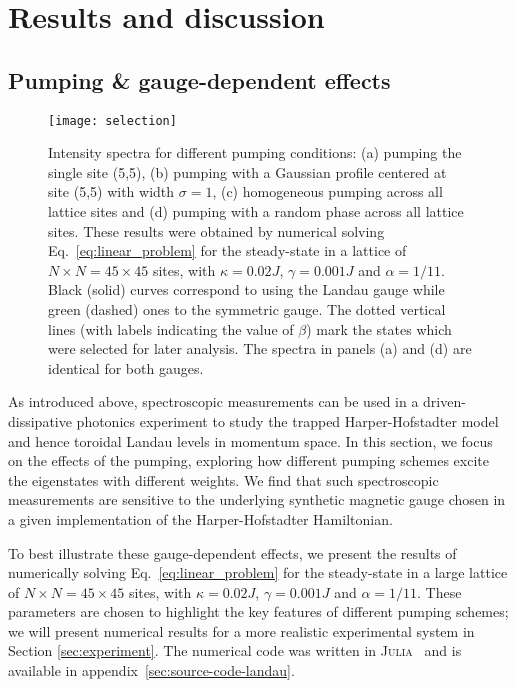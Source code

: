 \section{Results and discussion}
\label{sec:results}

\subsection{Pumping \& gauge-dependent effects}
\label{sec:selection}

\begin{figure}[tb]\centering
  \texttt{[image: selection]}
  \caption{Intensity spectra for different pumping conditions: (a)
pumping the single site (5,5), (b) pumping with a Gaussian profile
centered at site (5,5) with width $\sigma=1$, (c) homogeneous pumping
across all lattice sites and (d) pumping with a random phase across
all lattice sites. These results were obtained by numerical solving
Eq.~\eqref{eq:linear_problem} for the steady-state in a lattice of $N
\times N = 45 \times 45$ sites, with $\kappa = 0.02 J$, $\gamma =
0.001 J$ and $\alpha = 1/11$.  Black (solid) curves correspond to
using the Landau gauge while green (dashed) ones to the symmetric
gauge. The dotted vertical lines (with labels indicating the value of
$\beta$) mark the states which were selected for later analysis. The
spectra in panels (a) and (d) are identical for both gauges.}
  \label{fig:pumping_schemes}
\end{figure}

As introduced above, spectroscopic measurements can be used in a
driven-dissipative photonics experiment to study the trapped
Harper-Hofstadter model and hence toroidal Landau levels in momentum
space. In this section, we focus on the effects of the pumping,
exploring how different pumping schemes excite the eigenstates with
different weights. We find that such spectroscopic measurements are
sensitive to the underlying synthetic magnetic gauge chosen in a given
implementation of the Harper-Hofstadter Hamiltonian.

To best illustrate these gauge-dependent effects, we present the
results of numerically solving Eq.~\eqref{eq:linear_problem} for the
steady-state in a large lattice of $N \times N = 45 \times 45$ sites,
with $\kappa = 0.02 J$, $\gamma = 0.001 J$ and $\alpha = 1/11$.  These
parameters are chosen to highlight the key features of different
pumping schemes; we will present numerical results for a more
realistic experimental system in Section \ref{sec:experiment}.  The
numerical code was written in \textsc{Julia}~\cite{bezanson2014julia}
and is available in appendix~\ref{sec:source-code-landau}.

